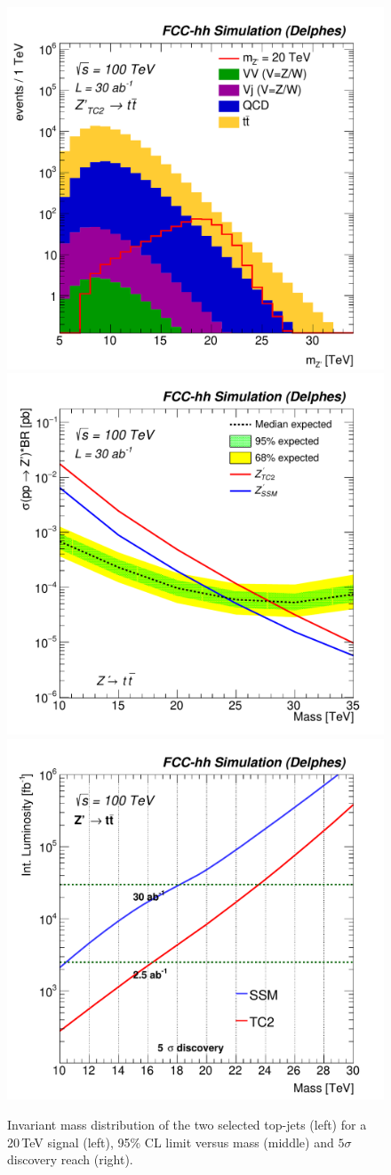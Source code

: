 \documentclass[a4paper,11pt]{article}
\begin{document}
\begin{figure}[!htb]
  \centering
   \includegraphics[width=0.32\columnwidth]{Fig/Mj1j2_pf08_MetCorr_fit_sel8_nostack_log-eps-converted-to.pdf}
   \includegraphics[width=0.32\columnwidth]{Fig/lim_Zprime_tt_fcc_v02-eps-converted-to.pdf}
   \includegraphics[width=0.32\columnwidth]{Fig/DiscoveryPotential_tt_SSM_TC2_tagger_TRFbtag_rootStyle-eps-converted-to.pdf}
  \caption{Invariant mass distribution of the two selected top-jets (left) for a 20\,TeV signal (left), 95\% CL limit versus mass (middle) and $5\sigma$ discovery reach (right).}
  \label{figure:hadronicresonances:tt}
\end{figure}


\end{document}
